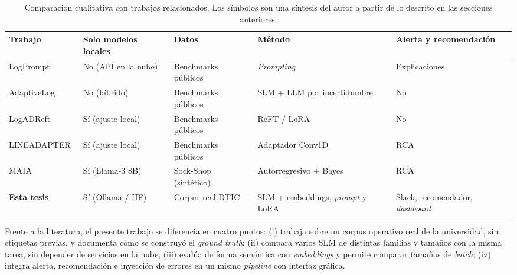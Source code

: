 \begin{table}[H]
\centering
\caption{Comparación cualitativa con trabajos relacionados. Los símbolos son una síntesis del autor a partir de lo descrito en las secciones anteriores.}
\label{tab:tr_comparacion}
\small
\begin{tabular}{@{}p{3.2cm}p{2.2cm}p{2.4cm}p{3.4cm}p{3.2cm}@{}}
\toprule
\textbf{Trabajo} & \textbf{Solo modelos locales} & \textbf{Datos} & \textbf{Método} & \textbf{Alerta y recomendación} \\
\midrule
LogPrompt~\cite{liu2024_logprompt} & No (API en la nube) & Benchmarks públicos & \textit{Prompting} & Explicaciones \\
AdaptiveLog~\cite{ma2026_adaptivelog} & No (híbrido) & Benchmarks públicos & SLM + LLM por incertidumbre & No \\
LogADReft~\cite{lim2025_logadreft} & Sí (ajuste local) & Benchmarks públicos & ReFT / LoRA & No \\
LINEADAPTER~\cite{liu2025_lineadapter} & Sí (ajuste local) & Benchmarks públicos & Adaptador Conv1D & RCA \\
MAIA~\cite{pedroso2025_maia} & Sí (Llama-3 8B) & Sock-Shop (sintético) & Autorregresivo + Bayes & RCA \\
\textbf{Esta tesis} & Sí (Ollama / HF) & Corpus real DTIC & SLM + embeddings, \textit{prompt} y LoRA & Slack, recomendador, \textit{dashboard} \\
\bottomrule
\end{tabular}
\normalsize
\end{table}


Frente a la literatura, el presente trabajo se diferencia en cuatro puntos: (i) trabaja sobre un corpus operativo real de la universidad, sin etiquetas previas, y documenta cómo se construyó el \textit{ground truth}; (ii) compara varios SLM de distintas familias y tamaños con la misma tarea, sin depender de servicios en la nube; (iii) evalúa de forma semántica con \textit{embeddings} y permite comparar tamaños de \textit{batch}; (iv) integra alerta, recomendación e inyección de errores en un mismo \textit{pipeline} con interfaz gráfica.
